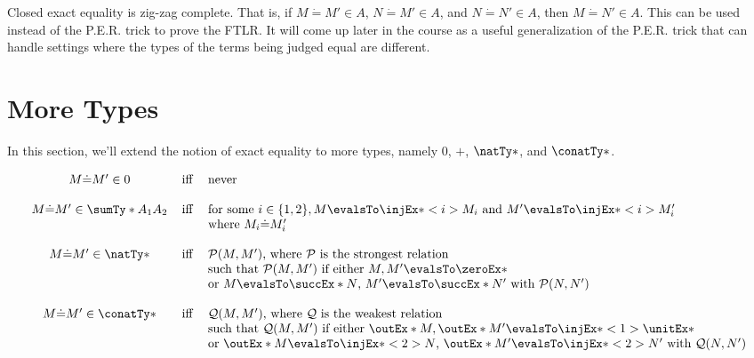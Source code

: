 \documentclass[letterpaper]{article}
\begin{document}
\begin{remark}

Closed exact equality is zig-zag complete. That is, if $M \dot{=} M' \in A$, $N \dot{=} M' \in A$, and $N \dot{=} N' \in A$, then $M \dot{=} N' \in A$. This can be used instead of the P.E.R. trick to prove the FTLR. It will come up later in the course as a useful generalization of the P.E.R. trick that can handle settings where the types of the terms being judged equal are different.

\end{remark}


\section{More Types}

In this section, we'll extend the notion of exact equality to more types, namely $0$, $+$, $\natTy*$, and $\conatTy*$.

\begin{definition}
    $$
  \begin{array}{cll}
      M \dot{=} M' \in 0 & \Iff & \text{never} \\
      \\
      M \dot{=} M' \in \sumTy*{A_1}{A_2} & \Iff & \text{for some } i \in \{1, 2\}, M \evalsTo \injEx*<i>{M_i} \text{ and } M' \evalsTo \injEx*<i>{M'_i} \\
      & & \text{where $M_i \dot{=} M'_i$} \\
      \\
      M \dot{=} M' \in \natTy* & \Iff & \text{$\mathcal P(M, M')$, where $\mathcal P$ is the strongest relation} \\
      & & \text{such that $\mathcal P(M, M')$ if either $M, M' \evalsTo \zeroEx*$} \\
      & & \text{or $M \evalsTo \succEx*{N}$, $M' \evalsTo \succEx*{N'}$ with $\mathcal P(N, N')$} \\
      \\
      M \dot{=} M' \in \conatTy* & \Iff & \text{$\mathcal Q(M, M')$, where $\mathcal Q$ is the weakest relation} \\
      & & \text{such that $\mathcal Q(M, M')$ if either $\outEx*{M}, \outEx*{M'} \evalsTo \injEx*<1>{\unitEx*}$} \\
      & & \text{or $\outEx*{M} \evalsTo \injEx*<2>{N}$, $\outEx*{M'} \evalsTo \injEx*<2>{N'}$ with $\mathcal Q(N, N')$} \\
  \end{array}
  $$
\end{definition}
\end{document}
